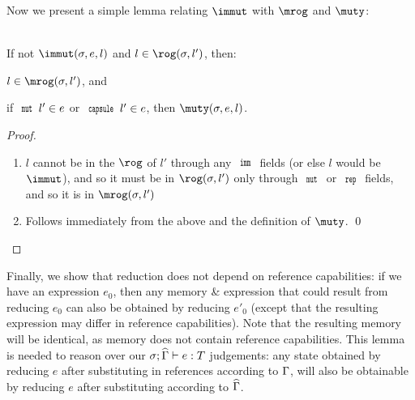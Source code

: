 \LS

Now we present a simple lemma relating $\immut$ with $\mrog$ and $\muty$:

\SS\begin{Lemma}\ \\
	\indent If not $\immut(\s,e,l)$ and $l\in\rog(\s,l')$, then:
	\begin{ienumerate}
		\item $l\in\mrog(\s,l')$, and
		\item if $\Kw{mut}\,l'\in e$ or $\Kw{capsule}\,l'\in e$, then $\muty(\s,e,l)$.
	\end{ienumerate}
\end{Lemma}
\SS\begin{proof}
	\SS\begin{enumerate}
		\item $l$ cannot be in the $\rog$ of $l'$ through any $\Kw{imm}$ fields (or else $l$ would be $\immut$), and so it must be in $\rog(\s,l')$ only through $\Kw{mut}$ or $\Kw{rep}$ fields, and so it is in $\mrog(\s,l')$
		\item Follows immediately from the above and the definition of $\muty$.
	\qed\end{enumerate}
\end{proof}

Finally, we show that reduction does not depend on reference capabilities:
if we have an expression $e_0$, then any memory \& expression that could result from reducing $e_0$ 
can also be obtained by reducing $e'_0$ (except that the resulting expression may differ in reference capabilities).
Note that the resulting memory will be identical, as memory does not contain reference capabilities.
This lemma is needed to reason over our $\ty[\s][\demut{\G}]{e}{T}$ judgements: any state obtained by reducing $e$ after substituting in references according to $\Gamma$, will also be obtainable by reducing $e$ after substituting according to $\widehat{\Gamma}$.

